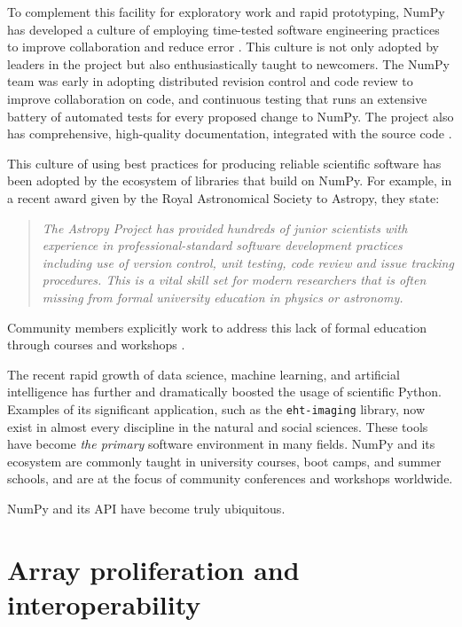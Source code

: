\documentclass[twocolumn]{article}
\begin{document}
To complement this facility for exploratory work and rapid
prototyping, NumPy has developed a culture of
employing time-tested software engineering practices to improve collaboration and
reduce error \cite{millman2014developing}.  This culture is not only
adopted by leaders in the project but also enthusiastically taught to
newcomers. The NumPy team was early in adopting distributed revision
control and code review to improve collaboration on code, and
continuous testing that runs an extensive battery of automated tests for
every proposed change to NumPy.  The project also has comprehensive,
high-quality documentation, integrated with the source
code \cite{vanderwalt2008scipy,harrington2008scipy,harrington2009scipy}.



This culture of using best practices for producing reliable scientific software
has been adopted by the ecosystem of libraries that build on NumPy.
For example, in a recent award given by the Royal Astronomical Society to
Astropy, they state:
\begin{quotation}
\noindent\emph{The Astropy Project has provided hundreds of junior scientists
with experience in professional-standard software development practices
including use of version control, unit testing, code review and issue tracking
procedures. This is a vital skill set for modern researchers that is often
missing from formal university education in physics or astronomy.}
\end{quotation}
Community members explicitly work to address this lack of formal education
through courses and workshops
\cite{wilson-software-carpentry,hannay-scientific-software-survey,millman2018teaching}.


The recent rapid growth of data science, machine learning, and
artificial intelligence has further and dramatically boosted the usage of
scientific Python.  Examples of its significant application, such as the
\texttt{eht-imaging} library, now exist in almost every discipline in the natural and social
sciences.  These tools have become \emph{the primary}
software environment in many fields.  NumPy and its ecosystem are commonly
taught in university courses, boot camps, and summer schools, and are
at the focus of community conferences and workshops worldwide.

NumPy and its API have become truly ubiquitous.

\section*{Array proliferation and interoperability}
\end{document}
